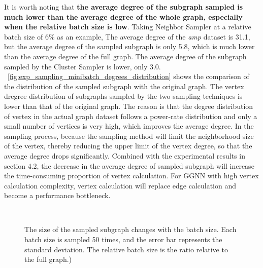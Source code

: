 It is worth noting that \textbf{the average degree of the subgraph sampled is much lower than the average degree of the whole graph,
    especially when the relative batch size is low}. Taking Neighbor Sampler at a relative batch size of 6\% as an example,
The average degree of the \textit{amp} dataset is 31.1, but the average degree of the sampled subgraph is only 5.8,
which is much lower than the average degree of the full graph.
The average degree of the subgraph sampled by the Cluster Sampler is lower, only 3.0.
\figurename~\ref{fig:exp_sampling_minibatch_degrees_distribution} shows the comparison of the distribution of the sampled subgraph with the original graph.
The vertex dregree distribution of subgraphs sampled by the two sampling techniques is lower than that of the original graph.
The reason is that the degree distribution of vertex in the actual graph dataset follows a power-rate distribution and only a small number of vertices is very high,
which improves the average degree. In the sampling process, because the sampling method will limit the neighborhood size of the vertex, thereby reducing the upper limit of the vertex degree,
so that the average degree drops significantly. Combined with the experimental results in section 4.2, the decrease in the average degree of sampled subgraph will increase the time-consuming
proportion of vertex calculation. For GGNN with high vertex calculation complexity, vertex calculation will replace edge calculation and become a performance bottleneck.

\begin{figure}
    \centering
     \\
    \caption{The size of the sampled subgraph changes with the batch size. Each batch size is sampled 50 times, and the error bar represents the standard deviation. The relative batch size is the ratio relative to the full graph.)}
    \label{fig:exp_sampling_minibatch_graph_info}
\end{figure}


